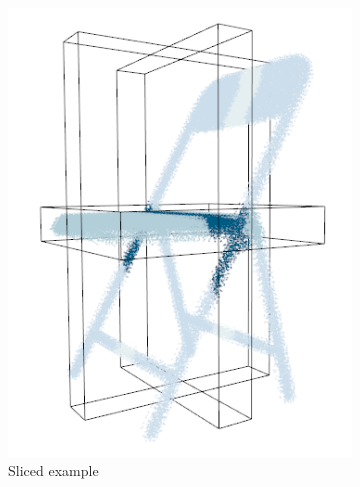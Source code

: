 \begin{figure}[!t]	
	\centering
	\begin{subfigure}[t]{0.3\linewidth}
		\centering
		\includegraphics[width=1\linewidth]{Figures/ObjRecog/slices/chairn_1}
        \caption{Sliced example}
        \label{fig:slicing_a}
	\end{subfigure}
	\begin{subfigure}[t]{0.3\linewidth}
		\centering

\end{subfigure}
\end{figure}
